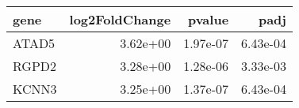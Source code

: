 \begin{tabular}{lrrr}
\toprule
 gene &  log2FoldChange &   pvalue &     padj \\
\midrule
ATAD5 &        3.62e+00 & 1.97e-07 & 6.43e-04 \\
RGPD2 &        3.28e+00 & 1.28e-06 & 3.33e-03 \\
KCNN3 &        3.25e+00 & 1.37e-07 & 6.43e-04 \\
\bottomrule
\end{tabular}
